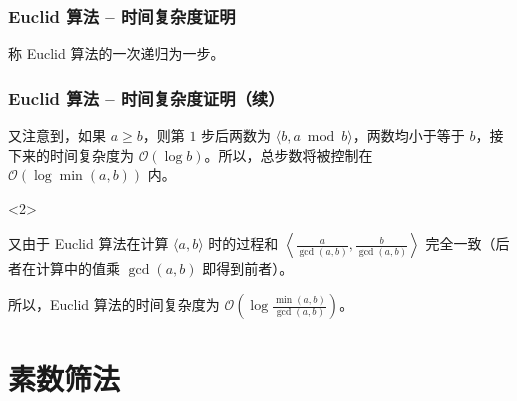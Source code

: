 \documentclass{../pkslide}
\begin{document}
\begin{frame}
  \frametitle{Euclid 算法 -- 时间复杂度证明}
  称 Euclid 算法的一次递归为一步。
  
  
  
\end{frame}

\begin{frame}
  \frametitle{Euclid 算法 -- 时间复杂度证明（续）}
  又注意到，如果 $a \ge b$，则第 $1$ 步后两数为 $\langle b, a \bmod b \rangle$，两数均小于等于 $b$，接下来的时间复杂度为 $\mathcal O (\log b)$。所以，总步数将被控制在 $\mathcal O (\log \min(a, b))$ 内。
  
  \begin{uncoverenv}<2>
    \emptyline
    
    又由于 Euclid 算法在计算 $\langle a, b \rangle$ 时的过程和 $\left\langle \frac{a}{\gcd(a, b)}, \frac{b}{\gcd(a, b)} \right\rangle$ 完全一致（后者在计算中的值乘 $\gcd(a, b)$ 即得到前者）。
    
    所以，Euclid 算法的时间复杂度为 $\mathcal O \!\left( \log \frac{\min(a, b)}{\gcd(a, b)} \right)$。
  \end{uncoverenv}
\end{frame}


\section{素数筛法}
\end{document}
